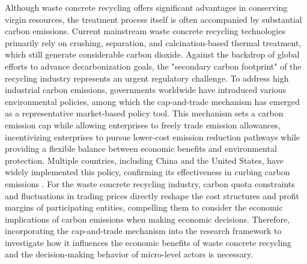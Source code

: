 \documentclass[authoryear,preprint,review,times,10pt]{elsarticle}
\begin{document}
Although waste concrete recycling offers significant advantages in conserving virgin resources, the treatment process itself is often accompanied by substantial carbon emissions. Current mainstream waste concrete recycling technologies primarily rely on crushing, separation, and calcination-based thermal treatment, which still generate considerable carbon dioxide. Against the backdrop of global efforts to advance decarbonization goals, the "secondary carbon footprint" of the recycling industry represents an urgent regulatory challenge. To address high industrial carbon emissions, governments worldwide have introduced various environmental policies, among which the cap-and-trade mechanism has emerged as a representative market-based policy tool. This mechanism sets a carbon emission cap while allowing enterprises to freely trade emission allowances, incentivizing enterprises to pursue lower-cost emission reduction pathways while providing a flexible balance between economic benefits and environmental protection. Multiple countries, including China and the United States, have widely implemented this policy, confirming its effectiveness in curbing carbon emissions \citep{yenipazarli2019Incentives}. For the waste concrete recycling industry, carbon quota constraints and fluctuations in trading prices directly reshape the cost structures and profit margins of participating entities, compelling them to consider the economic implications of carbon emissions when making economic decisions. Therefore, incorporating the cap-and-trade mechanism into the research framework to investigate how it influences the economic benefits of waste concrete recycling and the decision-making behavior of micro-level actors is necessary.
\end{document}
